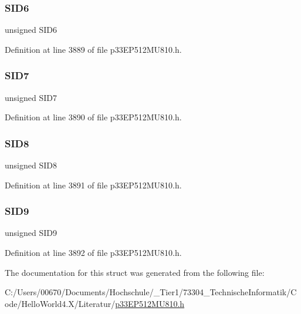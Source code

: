 \subsubsection{\texorpdfstring{S\+I\+D6}{SID6}}
{\footnotesize\ttfamily unsigned S\+I\+D6}



Definition at line 3889 of file p33\+E\+P512\+M\+U810.\+h.

\mbox{\label{structtag_c1_r_x_f3_s_i_d_b_i_t_s_a34097fb76decd431701fa2d86a22328e}} 
\subsubsection{\texorpdfstring{S\+I\+D7}{SID7}}
{\footnotesize\ttfamily unsigned S\+I\+D7}



Definition at line 3890 of file p33\+E\+P512\+M\+U810.\+h.

\mbox{\label{structtag_c1_r_x_f3_s_i_d_b_i_t_s_afe74894633244fdb0b0c01b4e8c522e7}} 
\subsubsection{\texorpdfstring{S\+I\+D8}{SID8}}
{\footnotesize\ttfamily unsigned S\+I\+D8}



Definition at line 3891 of file p33\+E\+P512\+M\+U810.\+h.

\mbox{\label{structtag_c1_r_x_f3_s_i_d_b_i_t_s_a33587704948067005c2a6a3ccc503c99}} 
\subsubsection{\texorpdfstring{S\+I\+D9}{SID9}}
{\footnotesize\ttfamily unsigned S\+I\+D9}



Definition at line 3892 of file p33\+E\+P512\+M\+U810.\+h.



The documentation for this struct was generated from the following file\+:\begin{DoxyCompactItemize}
\item 
C\+:/\+Users/00670/\+Documents/\+Hochschule/\+\_\+\+Tier1/73304\+\_\+\+Technische\+Informatik/\+Code/\+Hello\+World4.\+X/\+Literatur/\hyperlink{p33_e_p512_m_u810_8h}{p33\+E\+P512\+M\+U810.\+h}\end{DoxyCompactItemize}
